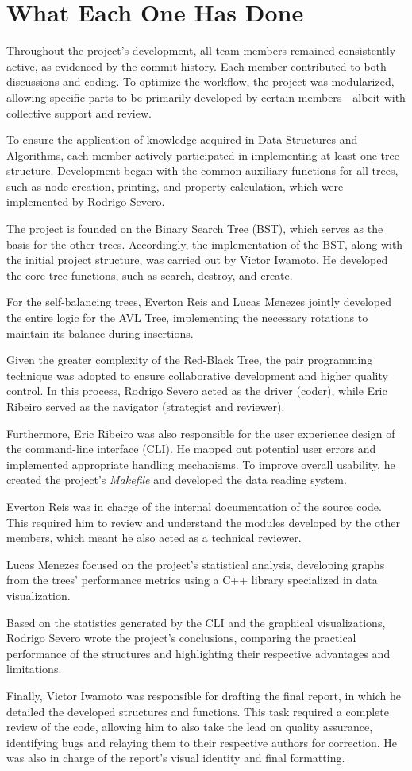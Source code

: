 \section{What Each One Has Done}

Throughout the project's development, all team members remained consistently active, as evidenced by the commit history. Each member contributed to both discussions and coding. To optimize the workflow, the project was modularized, allowing specific parts to be primarily developed by certain members—albeit with collective support and review.

To ensure the application of knowledge acquired in Data Structures and Algorithms, each member actively participated in implementing at least one tree structure. Development began with the common auxiliary functions for all trees, such as node creation, printing, and property calculation, which were implemented by Rodrigo Severo.

The project is founded on the Binary Search Tree (BST), which serves as the basis for the other trees. Accordingly, the implementation of the BST, along with the initial project structure, was carried out by Victor Iwamoto. He developed the core tree functions, such as search, destroy, and create.

For the self-balancing trees, Everton Reis and Lucas Menezes jointly developed the entire logic for the AVL Tree, implementing the necessary rotations to maintain its balance during insertions.

Given the greater complexity of the Red-Black Tree, the pair programming technique was adopted to ensure collaborative development and higher quality control. In this process, Rodrigo Severo acted as the driver (coder), while Eric Ribeiro served as the navigator (strategist and reviewer).

Furthermore, Eric Ribeiro was also responsible for the user experience design of the command-line interface (CLI). He mapped out potential user errors and implemented appropriate handling mechanisms. To improve overall usability, he created the project's \textit{Makefile} and developed the data reading system.

Everton Reis was in charge of the internal documentation of the source code. This required him to review and understand the modules developed by the other members, which meant he also acted as a technical reviewer.

Lucas Menezes focused on the project's statistical analysis, developing graphs from the trees' performance metrics using a C++ library specialized in data visualization.

Based on the statistics generated by the CLI and the graphical visualizations, Rodrigo Severo wrote the project's conclusions, comparing the practical performance of the structures and highlighting their respective advantages and limitations.

Finally, Victor Iwamoto was responsible for drafting the final report, in which he detailed the developed structures and functions. This task required a complete review of the code, allowing him to also take the lead on quality assurance, identifying bugs and relaying them to their respective authors for correction. He was also in charge of the report's visual identity and final formatting.